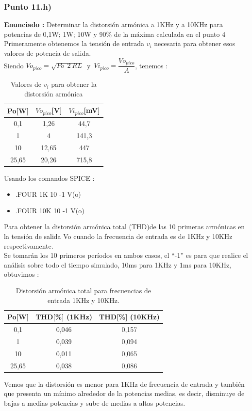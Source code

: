 \documentclass[12pt]{book}
\begin{document}
\subsubsection{Punto 11.h)}
\textbf{Enunciado : } Determinar la distorsión armónica a 1KHz y a 10KHz para potencias de 0,1W; 1W; 10W y 90\% de la máxima calculada en el punto 4\\[1cm]
Primeramente obtenemos la tensión de entrada $v_i$ necesaria para obtener esos valores de potencia de salida.\\
Siendo $Vo_{pico}=\sqrt{Po\:\:2\:RL}$\, y\, $Vi_{pico}=\dfrac{Vo_{pico}}{A}$, tenemos :
\begin{table}[H]
\centering
\begin{tabular}{|c|c|c|}
\hline
Po[W]&$Vo_{pico}$[V]&$Vi_{pico}$[mV]\\
\hline
0,1&1,26&44,7\\
\hline
1&4&141,3\\
\hline
10&12,65&447\\
\hline
25,65&20,26&715,8\\
\hline
\end{tabular}
\caption{Valores de $v_i$ para obtener la distorsión armónica}
\label{Vi-distorsion}
\end{table}

Usando los comandos SPICE :
\begin{itemize}
\item .FOUR 1K 10 -1 V(o)
\item .FOUR 10K 10 -1 V(o)
\end{itemize}
Para obtener la distorsión armónica total (THD)de las 10 primeras armónicas en la tensión de salida Vo cuando la frecuencia de entrada es de 1KHz y 10KHz respectivamente.\\
Se tomarán los 10 primeros períodos en ambos casos, el ``-1'' es para que realice el análisis sobre todo el tiempo simulado, 10ms para 1KHz y 1ms para 10KHz, obtuvimos :\\
\begin{table}[H]
\centering
\begin{tabular}{|c|c|c|}
\hline
Po[W]&THD[\%] (1KHz)&THD[\%] (10KHz)\\
\hline
0,1&0,046&0,157\\
\hline
1&0,039&0,094\\
\hline
10&0,011&0,065\\
\hline
25,65&0,038&0,086\\
\hline
\end{tabular}
\caption{Distorsión armónica total para frecuencias de entrada 1KHz y 10KHz.}
\label{11h-THD}
\end{table}
Vemos que la distorsión es menor para 1KHz de frecuencia de entrada y también que presenta un mínimo alrededor de la potencias medias, es decir, disminuye de bajas a medias potencias y sube de medias a altas potencias.
\end{document}
